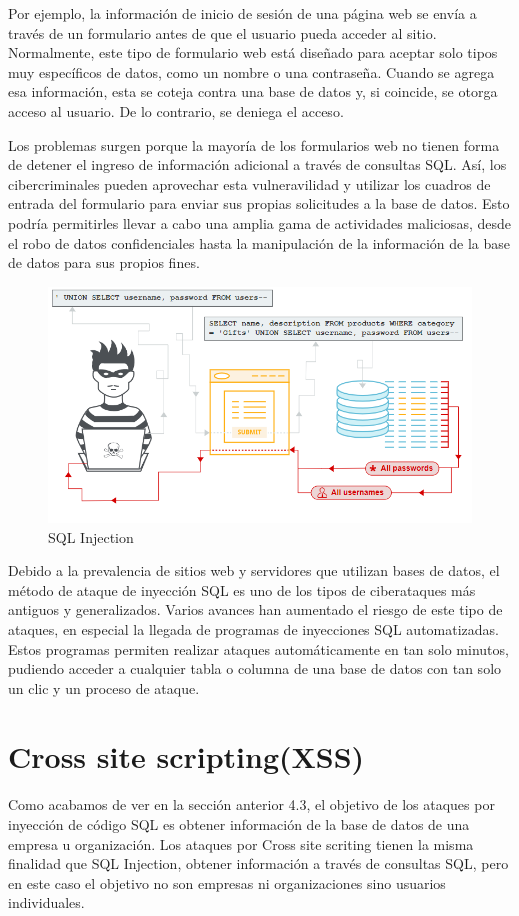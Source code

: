 Por ejemplo, la información de inicio de sesión de una página web se envía a través de un formulario antes de que el usuario pueda acceder al sitio. Normalmente, 
este tipo de formulario web está diseñado para aceptar solo tipos muy específicos de datos, como un nombre o una contraseña. Cuando se agrega esa información, 
esta se coteja contra una base de datos y, si coincide, se otorga acceso al usuario. De lo contrario, se deniega el acceso.

Los problemas surgen porque la mayoría de los formularios web no tienen forma de detener el ingreso de información adicional a través de consultas SQL. Así, los 
cibercriminales pueden aprovechar esta vulneravilidad y utilizar los cuadros de entrada del formulario para enviar sus propias solicitudes a la base de datos. Esto 
podría permitirles llevar a cabo una amplia gama de actividades maliciosas, desde el robo de datos confidenciales hasta la manipulación de la información de la base 
de datos para sus propios fines. \cite{sql_injection}

\begin{figure}[tphb]
  		   \centering
     		   \includegraphics[width=5in]{sqli.png}
  		   \caption{SQL Injection \cite{sqli}}
  		   \label{img:sqli}
\end{figure}

Debido a la prevalencia de sitios web y servidores que utilizan bases de datos, el método de ataque de inyección SQL es uno de los tipos de ciberataques más antiguos 
y generalizados. Varios avances han aumentado el riesgo de este tipo de ataques, en especial la llegada de programas de inyecciones SQL automatizadas. Estos
programas permiten realizar ataques automáticamente en tan solo minutos, pudiendo acceder a cualquier tabla o columna de una base de datos con tan solo un clic 
y un proceso de ataque.

\section{Cross site scripting(XSS)}
\label{sec:Cross site scripting}
Como acabamos de ver en la sección anterior 4.3, el objetivo de los ataques por inyección de código SQL es obtener información de la base de datos de una empresa 
u organización. Los ataques por Cross site scriting tienen la misma finalidad que SQL Injection, obtener información a través de consultas SQL, pero en este caso el 
objetivo no son empresas ni organizaciones sino usuarios individuales.

